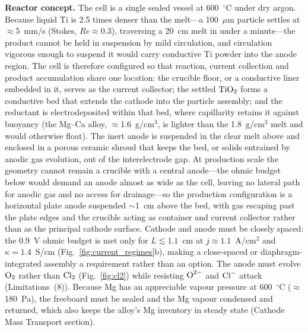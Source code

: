 \documentclass[11pt]{article}
\begin{document}
\textbf{Reactor concept.} The cell is a single sealed vessel at 600~$^{\circ}$C under dry argon. Because liquid Ti is 2.5 times denser than the melt---a 100~$\mu$m particle settles at $\approx$5~mm/s (Stokes, $Re \approx 0.3$), traversing a 20~cm melt in under a minute---the product cannot be held in suspension by mild circulation, and circulation vigorous enough to suspend it would carry conductive Ti powder into the anode region. The cell is therefore configured so that reaction, current collection and product accumulation share one location: the crucible floor, or a conductive liner embedded in it, serves as the current collector; the settled $\ce{TiO2}$ forms a conductive bed that extends the cathode into the particle assembly; and the reductant is electrodeposited within that bed, where capillarity retains it against buoyancy (the Mg--Ca alloy, $\approx$1.6~g/cm$^3$, is lighter than the 1.8~g/cm$^3$ melt and would otherwise float). The inert anode is suspended in the clear melt above and enclosed in a porous ceramic shroud that keeps the bed, or solids entrained by anodic gas evolution, out of the interelectrode gap. At production scale the geometry cannot remain a crucible with a central anode---the ohmic budget below would demand an anode almost as wide as the cell, leaving no lateral path for anodic gas and no access for drainage---so the production configuration is a horizontal plate anode suspended $\sim$1~cm above the bed, with gas escaping past the plate edges and the crucible acting as container and current collector rather than as the principal cathode surface. Cathode and anode must be closely spaced: the 0.9~V ohmic budget is met only for $L \lesssim 1.1$~cm at $j \approx 1.1$~A/cm$^2$ and $\kappa = 1.4$~S/cm (Fig.~\ref{fig:current_regimes}b), making a close-spaced or diaphragm-integrated assembly a requirement rather than an option. The anode must evolve $\ce{O2}$ rather than $\ce{Cl2}$ (Fig.~\ref{fig:cl2}) while resisting $\ce{O^{2-}}$ and $\ce{Cl^-}$ attack (Limitations~(8)). Because Mg has an appreciable vapour pressure at 600~$^{\circ}$C ($\approx$180~Pa), the freeboard must be sealed and the Mg vapour condensed and returned, which also keeps the alloy's Mg inventory in steady state (Cathode Mass Transport section).
\end{document}
